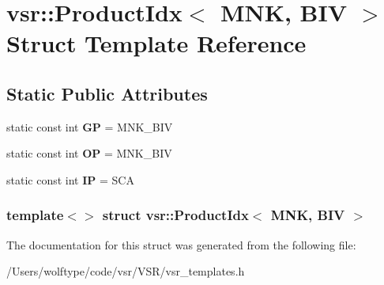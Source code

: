 \hypertarget{structvsr_1_1_product_idx_3_01_m_n_k_00_01_b_i_v_01_4}{\section{vsr\-:\-:Product\-Idx$<$ M\-N\-K, B\-I\-V $>$ Struct Template Reference}
\label{structvsr_1_1_product_idx_3_01_m_n_k_00_01_b_i_v_01_4}
}
\subsection*{Static Public Attributes}
\begin{DoxyCompactItemize}
\item 
\hypertarget{structvsr_1_1_product_idx_3_01_m_n_k_00_01_b_i_v_01_4_ad8fc987ce03c1235e4193723dd9efd36}{static const int {\bfseries G\-P} = M\-N\-K\-\_\-\-B\-I\-V}\label{structvsr_1_1_product_idx_3_01_m_n_k_00_01_b_i_v_01_4_ad8fc987ce03c1235e4193723dd9efd36}

\item 
\hypertarget{structvsr_1_1_product_idx_3_01_m_n_k_00_01_b_i_v_01_4_a73567929c245de74859cf4bfd91d7fbb}{static const int {\bfseries O\-P} = M\-N\-K\-\_\-\-B\-I\-V}\label{structvsr_1_1_product_idx_3_01_m_n_k_00_01_b_i_v_01_4_a73567929c245de74859cf4bfd91d7fbb}

\item 
\hypertarget{structvsr_1_1_product_idx_3_01_m_n_k_00_01_b_i_v_01_4_a45cd3cd6f4c72d2315f94b1301b2602d}{static const int {\bfseries I\-P} = S\-C\-A}\label{structvsr_1_1_product_idx_3_01_m_n_k_00_01_b_i_v_01_4_a45cd3cd6f4c72d2315f94b1301b2602d}

\end{DoxyCompactItemize}
\subsubsection*{template$<$$>$ struct vsr\-::\-Product\-Idx$<$ M\-N\-K, B\-I\-V $>$}



The documentation for this struct was generated from the following file\-:\begin{DoxyCompactItemize}
\item 
/\-Users/wolftype/code/vsr/\-V\-S\-R/vsr\-\_\-templates.\-h\end{DoxyCompactItemize}
